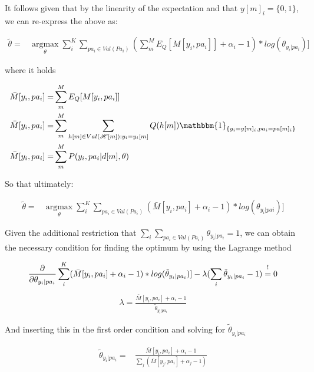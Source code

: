 \documentclass[11pt]{article}
\begin{document}
\begin{article}
It follows given that by the linearity of the expectation and that
\(y[m]_i = \{0,1\}\), we can re-express the above as:

\begin{align} \label{eq:solution1}
\tilde{\theta} =& \operatorname*{argmax}_{\theta} \sum_i^K \sum_{pa_i \in Val(Pa_i)} (\sum_m^M E_Q[M[y_i, pa_{i}]] + \alpha_i - 1) * log(\theta_{y_i | pa_{i}})] 
\end{align}

where it holds

\begin{align} \label{eq:expected_sufficient}
\bar{M}[y_i, pa_{i}]  =& \sum_m^M E_Q[M[y_i, pa_{i}]]\\
\bar{M}[y_i, pa_{i}]  =& \sum_m^M \sum_{h[m] \in Val(\mathscr{H}[m]): y_i = y_i[m]} Q(h[m]) \mathbbm{1}_{\{y_i = y[m]_i, pa_i = pa[m]_i\}}\\
\bar{M}[y_i, pa_{i}]  =& \sum_m^M P(y_i, pa_i | d[m], \theta)
\end{align}

So that ultimately:

\begin{align} \label{eq:solution2}
\tilde{\theta} =& \operatorname*{argmax}_{\theta} \sum_i^K  \sum_{pa_i \in Val(Pa_i)} (\bar{M}[y_i, pa_{i}] + \alpha_i - 1) * log(\theta_{y_i | pa{i}})] 
\end{align}

Given the additional restriction that \(\sum_i \sum_{pa_i \in
   Val(Pa_i)} \theta_{y_i | pa_{i}} = 1\), we can obtain the necessary
condition for finding the optimum by using the Lagrange method

\begin{align} \label{eq:first-order1}
\frac{\partial}{\partial \theta_{y_i | pa_{i}}} \sum_i^K (\bar{M}[y_i, pa_{i}] + \alpha_i - 1) * log(\tilde{\theta}_{y_i | pa_{i}})] - \lambda (\sum_i \tilde{\theta}_{y_i | pa_{i}} - 1) \mathrel{\stackon[5pt]{$=$}{$\scriptstyle!$}} 0
\end{align}
\begin{align} \label{eq:first-order2}
\lambda = \frac{\bar{M}[y_i, pa_{i}] + \alpha_i - 1}{\tilde{\theta}_{y_i | pa_{i}}}
\end{align}

And inserting this in the first order condition and solving for
\(\tilde{\theta}_{y_i | pa_{i}}\)

\begin{align} \label{eq:solution}
\tilde{\theta}_{y_i | pa_{i}} =& \frac{\bar{M}[y_i, pa_{i}] + \alpha_i - 1}{\sum_j (\bar{M}[y_j, pa_{i}] + \alpha_j - 1)}
\end{align}


\end{article}
\end{document}
